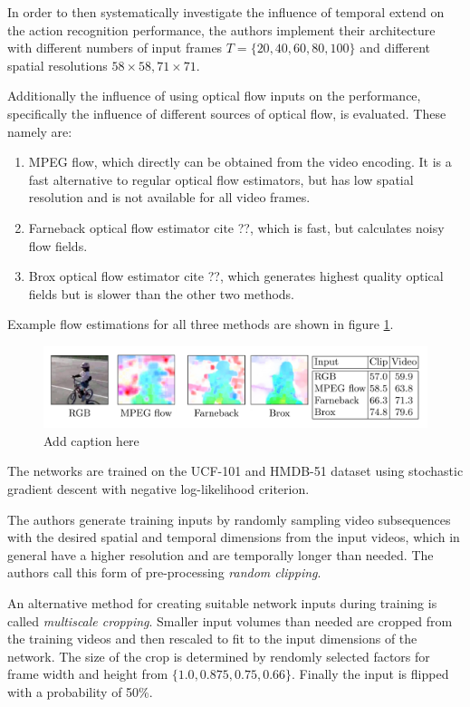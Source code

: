 In order to then systematically investigate the influence of temporal extend on the action recognition performance, the authors implement their architecture with different numbers of input frames $T = \{20, 40, 60, 80, 100\}$ and different spatial resolutions ${58 \times 58, 71 \times 71}$.

Additionally the influence of using optical flow inputs on the performance, specifically the influence of different sources of optical flow, is evaluated. These namely are:
\begin{enumerate}
    \item MPEG flow, which directly can be obtained from the video encoding. It is a fast alternative to regular optical flow estimators, but has low spatial resolution and is not available for all video frames.
    \item Farneback optical flow estimator cite ??, which is fast, but calculates noisy flow fields.
    \item Brox optical flow estimator cite ??, which generates highest quality optical fields but is slower than the other two methods.
\end{enumerate}

Example flow estimations for all three methods are shown in figure \ref{fig:longterm_optflow}.

\begin{figure}[H]
    \centering
    \includegraphics[width=\textwidth]{img_deep/longterm_optflow}
    \caption{Add caption here}
    \label{fig:longterm_optflow}
\end{figure}

The networks are trained on the UCF-101 and HMDB-51 dataset using stochastic gradient descent with negative log-likelihood criterion.

The authors generate training inputs by randomly sampling video subsequences with the desired spatial and temporal dimensions from the input videos, which in general have a higher resolution and are temporally longer than needed. The authors call this form of pre-processing \textit{random clipping}.

An alternative method for creating suitable network inputs during training is called \textit{multiscale cropping}.
Smaller input volumes than needed are cropped from the training videos and then rescaled to fit to the input dimensions of the network.
The size of the crop is determined by rendomly selected factors for frame width and height from $\{1.0, 0.875, 0.75, 0.66\}$.
Finally the input is flipped with a probability of 50\%.

